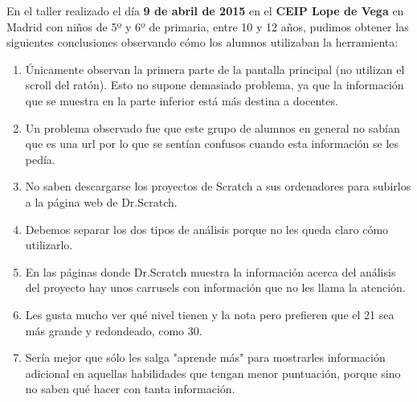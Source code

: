 \documentclass[a4paper,12pt]{letter}
\begin{document}
\begin{letter}
    En el taller realizado el día \textbf {9 de abril de 2015} en el \textbf {CEIP Lope de Vega} en Madrid con niños de 5º y 6º de primaria, entre 10 y 12 años, pudimos obtener las siguientes conclusiones observando cómo los alumnos utilizaban la herramienta:
\begin{enumerate}  
    \item {Únicamente observan la primera parte de la pantalla principal (no utilizan el scroll del ratón). Esto no supone demasiado problema, ya que la información que se muestra en la parte inferior está más destina a docentes.}
    \item {Un problema observado fue que este grupo de alumnos en general no sabían que es una url por lo que se sentían confusos cuando esta información se les pedía.}
    \item {No saben descargarse los proyectos de Scratch a sus ordenadores para subirlos a la página web de Dr.Scratch.}
    \item {Debemos separar los dos tipos de análisis porque no les queda claro cómo utilizarlo.}
    \item {En las páginas donde Dr.Scratch muestra la información acerca del análisis del proyecto hay unos carrusels con información que no les llama la atención.}
    \item {Les gusta mucho ver qué nivel tienen y la nota pero prefieren que el 21 sea más grande y redondeado, como 30.}
    \item {Sería mejor que sólo les salga "aprende más" para mostrarles información adicional en aquellas habilidades que tengan menor puntuación, porque sino no saben qué hacer con tanta información.}
\end{enumerate}

\end{letter}
\end{document}
